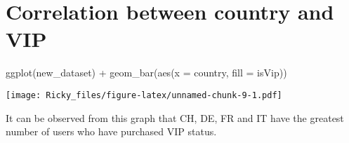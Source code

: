 \documentclass[
]{article}
\newenvironment{Shaded}{\begin{snugshade}}{\end{snugshade}}
\newcommand{\AttributeTok}[1]{\textcolor[rgb]{0.77,0.63,0.00}{#1}}
\newcommand{\FunctionTok}[1]{\textcolor[rgb]{0.00,0.00,0.00}{#1}}
\newcommand{\NormalTok}[1]{#1}
\newcommand{\SpecialCharTok}[1]{\textcolor[rgb]{0.00,0.00,0.00}{#1}}
\begin{document}
\hypertarget{correlation-between-country-and-vip}{%
\section{Correlation between country and
VIP}\label{correlation-between-country-and-vip}}

\begin{Shaded}
\begin{Highlighting}[]
\FunctionTok{ggplot}\NormalTok{(new\_dataset) }\SpecialCharTok{+}
  \FunctionTok{geom\_bar}\NormalTok{(}\FunctionTok{aes}\NormalTok{(}\AttributeTok{x =}\NormalTok{ country, }\AttributeTok{fill =}\NormalTok{ isVip))}
\end{Highlighting}
\end{Shaded}

\texttt{[image: Ricky\_files/figure-latex/unnamed-chunk-9-1.pdf]}

It can be observed from this graph that CH, DE, FR and IT have the
greatest number of users who have purchased VIP status.
\end{document}

